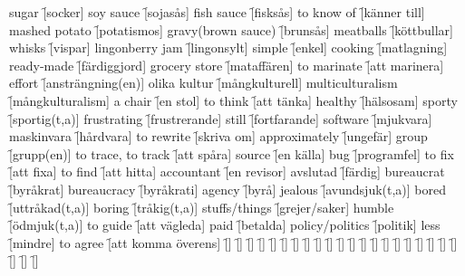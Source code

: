 \begin{questions}
\begin{multicols}{2}
        \question sugar \f[socker]
        \question soy sauce \f[sojasås]
        \question fish sauce \f[fisksås]
        \question to know of \f[känner till]
        \question mashed potato \f[potatismos]
        \question gravy(brown sauce) \f[brunsås]
        \question meatballs \f[köttbullar]
        \question whisks \f[vispar]
        \question lingonberry jam \f[lingonsylt]
        \question simple \f[enkel]
        \question cooking \f[matlagning]
        \question ready-made \f[färdiggjord]
        \question grocery store \f[mataffären]
        \question to marinate \f[att marinera]
        \question effort \f[ansträngning(en)]
        \question olika kultur \f[mångkulturell]
        \question multiculturalism \f[mångkulturalism]
        \question a chair \f[en stol]
        \question to think \f[att tänka]
        \question healthy \f[hälsosam]
        \question sporty \f[sportig(t,a)]
        \question frustrating \f[frustrerande]
        \question still \f[fortfarande]
        \question software \f[mjukvara]
        \question maskinvara \f[hårdvara]
        \question to rewrite \f[skriva om]
        \question approximately \f[ungefär]
        \question group \f[grupp(en)]
        \question to trace, to track \f[att spåra]
        \question source \f[en källa]
        \question bug \f[programfel]
        \question to fix \f[att fixa]
        \question to find \f[att hitta]
        \question accountant \f[en revisor]
        \question avslutad \f[färdig]
        \question bureaucrat \f[byråkrat]
        \question bureaucracy \f[byråkrati]
        \question agency \f[byrå]
        \question jealous \f[avundsjuk(t,a)]
        \question bored \f[uttråkad(t,a)]
        \question boring \f[tråkig(t,a)]
        \question stuffs/things \f[grejer/saker]
        \question humble \f[ödmjuk(t,a)]
        \question to guide \f[att vägleda]
        \question paid \f[betalda]
        \question policy/politics \f[politik]
        \question less \f[mindre]
        \question to agree \f[att komma överens]
        \question  \f[]
        \question  \f[]
        \question  \f[]
        \question  \f[]
        \question  \f[]
        \question  \f[]
        \question  \f[]
        \question  \f[]
        \question  \f[]
        \question  \f[]
        \question  \f[]
        \question  \f[]
        \question  \f[]
        \question  \f[]
        \question  \f[]
        \question  \f[]
        \question  \f[]
        \question  \f[]
        \question  \f[]
        \question  \f[]
        \question  \f[]
        \question  \f[]
        \question  \f[]
        \question  \f[]

\end{multicols}
\end{questions}
